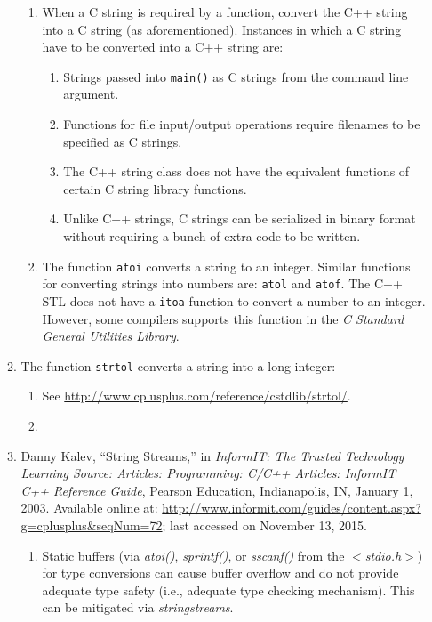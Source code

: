 \begin{enumerate}
\begin{enumerate}
\begin{enumerate}
		\item When a C string is required by a function, convert the C++ string into a C string (as aforementioned). Instances in which a C string have to be converted into a C++ string are: \vspace{-0.1cm}
			\begin{enumerate} \itemsep -1pt
			\item Strings passed into {\tt main()} as C strings from the command line argument.
			\item Functions for file input/output operations require filenames to be specified as C strings.
			\item The C++ string class does not have the equivalent functions of certain C string library functions.
			\item Unlike C++ strings, C strings can be serialized in binary format without requiring a bunch of extra code to be written.
			\end{enumerate}
		\item The function {\tt atoi} converts a string to an integer. Similar functions for converting strings into numbers are: {\tt atol} and {\tt atof}. The C++ STL does not have a {\tt itoa} function to convert a number to an integer. However, some compilers supports this function in the {\it C Standard General Utilities Library}.
		\end{enumerate}
	\item The function {\tt strtol} converts a string into a long integer: \vspace{-0.2cm}
		\begin{enumerate} \itemsep -2pt
		\item See \url{http://www.cplusplus.com/reference/cstdlib/strtol/}.
		\item \cite[$<$cstdlib$>$ (stdlib.h) -- C Standard General Utilities Library: {\tt strtol} function]{CplusplusCom2015}
		\end{enumerate}
	\item Danny Kalev, ``String Streams,'' in {\it {InformIT}: The Trusted Technology Learning Source: Articles: Programming: {C/C++} Articles: {InformIT C++} Reference Guide}, Pearson Education, Indianapolis, IN, January 1, 2003. Available online at: \url{http://www.informit.com/guides/content.aspx?g=cplusplus&seqNum=72}; last accessed on November 13, 2015. \vspace{-0.2cm}
		\begin{enumerate} \itemsep -2pt
		\item Static buffers (via {\it atoi()}, {\it sprintf()}, or {\it sscanf()} from the {\it $<$stdio.h$>$}) for type conversions can cause buffer overflow and do not provide adequate type safety (i.e., adequate type checking mechanism). This can be mitigated via {\it stringstreams}.

\end{enumerate}
\end{enumerate}
\end{enumerate}
